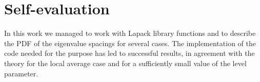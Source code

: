 \documentclass[pra, onecolumn, notitlepage, floats, 11pt]{revtex4-1}
\begin{document}
\section{Self-evaluation}
In this work we managed to work with Lapack library functions and to describe the PDF of the eigenvalue spacings for several cases. The implementation of the code needed for the purpose has led to successful results, in agreement with the theory for the local average case and for a sufficiently small value of the level parameter.
\end{document}

